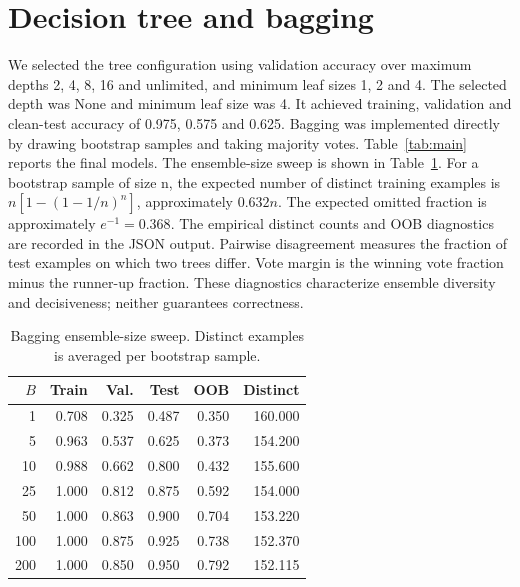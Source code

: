 \documentclass[10pt,twocolumn,letterpaper]{article}
\begin{document}
\section{Decision tree and bagging}
We selected the tree configuration using validation accuracy over maximum depths 2, 4, 8, 16 and unlimited, and minimum leaf sizes 1, 2 and 4. The selected depth was None and minimum leaf size was 4. It achieved training, validation and clean-test accuracy of 0.975, 0.575 and 0.625.
Bagging was implemented directly by drawing bootstrap samples and taking majority votes. Table~\ref{tab:main} reports the final models. The ensemble-size sweep is shown in Table~\ref{tab:bag}. For a bootstrap sample of size n, the expected number of distinct training examples is $n[1-(1-1/n)^n]$, approximately $0.632n$. The expected omitted fraction is approximately $e^{-1}=0.368$. The empirical distinct counts and OOB diagnostics are recorded in the JSON output.
Pairwise disagreement measures the fraction of test examples on which two trees differ. Vote margin is the winning vote fraction minus the runner-up fraction. These diagnostics characterize ensemble diversity and decisiveness; neither guarantees correctness.
\begin{table}[t]\centering\scriptsize
\caption{Bagging ensemble-size sweep. Distinct examples is averaged per bootstrap sample.}\label{tab:bag}
\begin{tabular}{rrrrrr}\toprule
$B$ & Train & Val. & Test & OOB & Distinct\\\midrule
1 & 0.708 & 0.325 & 0.487 & 0.350 & 160.000 \\
5 & 0.963 & 0.537 & 0.625 & 0.373 & 154.200 \\
10 & 0.988 & 0.662 & 0.800 & 0.432 & 155.600 \\
25 & 1.000 & 0.812 & 0.875 & 0.592 & 154.000 \\
50 & 1.000 & 0.863 & 0.900 & 0.704 & 153.220 \\
100 & 1.000 & 0.875 & 0.925 & 0.738 & 152.370 \\
200 & 1.000 & 0.850 & 0.950 & 0.792 & 152.115 \\
\bottomrule\end{tabular}\end{table}
\end{document}
